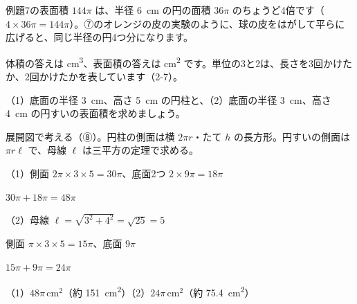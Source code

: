 \noindent\begin{minipage}[c]{0.56\linewidth}
例題7の表面積 $144\pi$ は、半径 \qty{6}{cm} の円の面積 $36\pi$ のちょうど4倍です（$4\times36\pi=144\pi$）。⑦のオレンジの皮の実験のように、球の皮をはがして平らに広げると、同じ半径の円4つ分になります。

体積の答えは \unit{cm^3}、表面積の答えは \unit{cm^2} です。単位の3と2は、長さを3回かけたか、2回かけたかを表しています（2-7）。
\end{minipage}\hfill
\begin{minipage}[c]{0.4\linewidth}\centering
{}
\end{minipage}

\begin{reidai}[円柱と円すいの表面積]
（1）底面の半径 \qty{3}{cm}、高さ \qty{5}{cm} の円柱と、（2）底面の半径 \qty{3}{cm}、高さ \qty{4}{cm} の円すいの表面積を求めましょう。\par
\kangaekata 展開図で考える（⑧）。円柱の側面は横 $2\pi r$・たて $h$ の長方形。円すいの側面は $\pi r\ell$ で、母線 $\ell$ は三平方の定理で求める。\par
\shiki（1）側面 $2\pi\times3\times5=30\pi$、底面2つ $2\times9\pi=18\pi$\par
\hspace*{4.6\zw}$30\pi+18\pi=48\pi$\par
\hspace*{2.6\zw}（2）母線 $\ell=\sqrt{3^2+4^2}=\sqrt{25}=5$\par
\hspace*{4.6\zw}側面 $\pi\times3\times5=15\pi$、底面 $9\pi$\par
\hspace*{4.6\zw}$15\pi+9\pi=24\pi$\par
\kotae（1）$48\pi$\,cm$^2$（約 \qty{151}{cm^2}）\quad（2）$24\pi$\,cm$^2$（約 \qty{75.4}{cm^2}）
\end{reidai}

